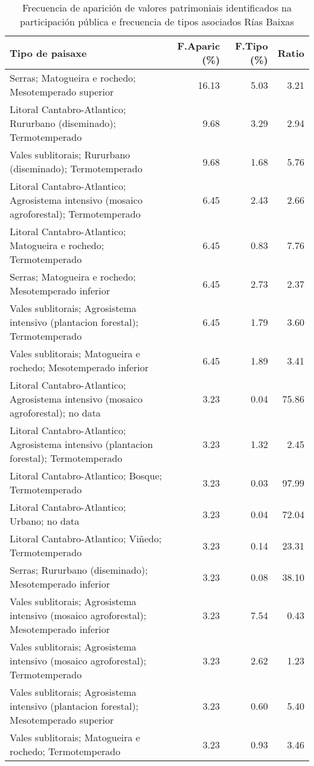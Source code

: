 \begin{table}[p]
\centering
\caption{Frecuencia de aparición de valores patrimoniais identificados na participación pública e frecuencia de tipos asociados Rías Baixas} 
\label{vsixotpat12}
\begin{tabular}{lrrr}
  \hline
Tipo de paisaxe & F.Aparic (\%) & F.Tipo (\%) & Ratio \\ 
  \hline
Serras; Matogueira e rochedo; Mesotemperado superior & 16.13 & 5.03 & 3.21 \\ 
  Litoral Cantabro-Atlantico; Rururbano (diseminado); Termotemperado & 9.68 & 3.29 & 2.94 \\ 
  Vales sublitorais; Rururbano (diseminado); Termotemperado & 9.68 & 1.68 & 5.76 \\ 
  Litoral Cantabro-Atlantico; Agrosistema intensivo (mosaico agroforestal); Termotemperado & 6.45 & 2.43 & 2.66 \\ 
  Litoral Cantabro-Atlantico; Matogueira e rochedo; Termotemperado & 6.45 & 0.83 & 7.76 \\ 
  Serras; Matogueira e rochedo; Mesotemperado inferior & 6.45 & 2.73 & 2.37 \\ 
  Vales sublitorais; Agrosistema intensivo (plantacion forestal); Termotemperado & 6.45 & 1.79 & 3.60 \\ 
  Vales sublitorais; Matogueira e rochedo; Mesotemperado inferior & 6.45 & 1.89 & 3.41 \\ 
  Litoral Cantabro-Atlantico; Agrosistema intensivo (mosaico agroforestal); no data & 3.23 & 0.04 & 75.86 \\ 
  Litoral Cantabro-Atlantico; Agrosistema intensivo (plantacion forestal); Termotemperado & 3.23 & 1.32 & 2.45 \\ 
  Litoral Cantabro-Atlantico; Bosque; Termotemperado & 3.23 & 0.03 & 97.99 \\ 
  Litoral Cantabro-Atlantico; Urbano; no data & 3.23 & 0.04 & 72.04 \\ 
  Litoral Cantabro-Atlantico; Viñedo; Termotemperado & 3.23 & 0.14 & 23.31 \\ 
  Serras; Rururbano (diseminado); Mesotemperado inferior & 3.23 & 0.08 & 38.10 \\ 
  Vales sublitorais; Agrosistema intensivo (mosaico agroforestal); Mesotemperado inferior & 3.23 & 7.54 & 0.43 \\ 
  Vales sublitorais; Agrosistema intensivo (mosaico agroforestal); Termotemperado & 3.23 & 2.62 & 1.23 \\ 
  Vales sublitorais; Agrosistema intensivo (plantacion forestal); Mesotemperado superior & 3.23 & 0.60 & 5.40 \\ 
  Vales sublitorais; Matogueira e rochedo; Termotemperado & 3.23 & 0.93 & 3.46 \\ 
   \hline
\end{tabular}
\end{table}

